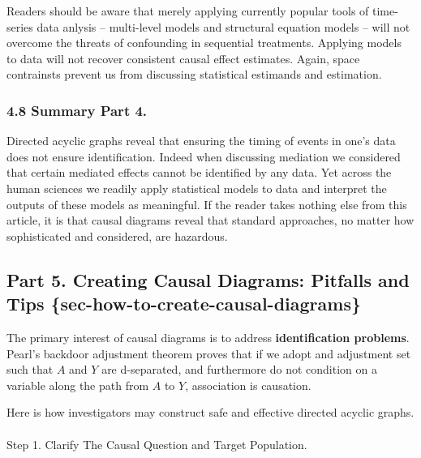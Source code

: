 \documentclass[
  single column]{article}
\makeatletter
\let\oldparagraph\paragraph
\renewcommand{\paragraph}{
    \@ifstar
      \xxxParagraphStar
      \xxxParagraphNoStar
  }
\newcommand{\xxxParagraphStar}[1]{\oldparagraph*{#1}\mbox{}}
\newcommand{\xxxParagraphNoStar}[1]{\oldparagraph{#1}\mbox{}}
\makeatother
\begin{document}
Readers should be aware that merely applying currently popular tools of
time-series data anlysis -- multi-level models and structural equation
models -- will not overcome the threats of confounding in sequential
treatments. Applying models to data will not recover consistent causal
effect estimates. Again, space contrainsts prevent us from discussing
statistical estimands and estimation.

\subsubsection{4.8 Summary Part 4.}\label{summary-part-4.}

Directed acyclic graphs reveal that ensuring the timing of events in
one's data does not ensure identification. Indeed when discussing
mediation we considered that certain mediated effects cannot be
identified by any data. Yet across the human sciences we readily apply
statistical models to data and interpret the outputs of these models as
meaningful. If the reader takes nothing else from this article, it is
that causal diagrams reveal that standard approaches, no matter how
sophisticated and considered, are hazardous.

\subsection{Part 5. Creating Causal Diagrams: Pitfalls and Tips
\{sec-how-to-create-causal-diagrams\}}\label{part-5.-creating-causal-diagrams-pitfalls-and-tips-sec-how-to-create-causal-diagrams}

The primary interest of causal diagrams is to address
\textbf{identification problems}. Pearl's backdoor adjustment theorem
proves that if we adopt and adjustment set such that \(A\) and \(Y\) are
d-separated, and furthermore do not condition on a variable along the
path from \(A\) to \(Y\), association is causation.

Here is how investigators may construct safe and effective directed
acyclic graphs.

\paragraph{Step 1. Clarify The Causal Question and Target
Population.}\label{step-1.-clarify-the-causal-question-and-target-population.}
\end{document}
